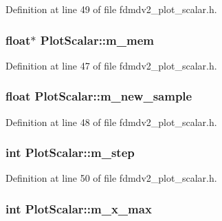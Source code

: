 Definition at line 49 of file fdmdv2\-\_\-plot\-\_\-scalar.\-h.

\hypertarget{class_plot_scalar_a28e4e09d513bce7b2890635d1ed1967d}{
\subsubsection[{m\-\_\-mem}]{\setlength{\rightskip}{0pt plus 5cm}float$\ast$ Plot\-Scalar\-::m\-\_\-mem\hspace{0.3cm}{\ttfamily [protected]}}}\label{class_plot_scalar_a28e4e09d513bce7b2890635d1ed1967d}


Definition at line 47 of file fdmdv2\-\_\-plot\-\_\-scalar.\-h.

\hypertarget{class_plot_scalar_a963d1a8e34175f7d3b1f82fa4e71ae19}{
\subsubsection[{m\-\_\-new\-\_\-sample}]{\setlength{\rightskip}{0pt plus 5cm}float Plot\-Scalar\-::m\-\_\-new\-\_\-sample\hspace{0.3cm}{\ttfamily [protected]}}}\label{class_plot_scalar_a963d1a8e34175f7d3b1f82fa4e71ae19}


Definition at line 48 of file fdmdv2\-\_\-plot\-\_\-scalar.\-h.

\hypertarget{class_plot_scalar_a8e057f0175729eea2a6e8ec5597bb1c0}{
\subsubsection[{m\-\_\-step}]{\setlength{\rightskip}{0pt plus 5cm}int Plot\-Scalar\-::m\-\_\-step\hspace{0.3cm}{\ttfamily [protected]}}}\label{class_plot_scalar_a8e057f0175729eea2a6e8ec5597bb1c0}


Definition at line 50 of file fdmdv2\-\_\-plot\-\_\-scalar.\-h.

\hypertarget{class_plot_scalar_a9a9edfbd8517f1ce1e7b75bcd4fda4f5}{
\subsubsection[{m\-\_\-x\-\_\-max}]{\setlength{\rightskip}{0pt plus 5cm}int Plot\-Scalar\-::m\-\_\-x\-\_\-max\hspace{0.3cm}{\ttfamily [protected]}}}\label{class_plot_scalar_a9a9edfbd8517f1ce1e7b75bcd4fda4f5}


